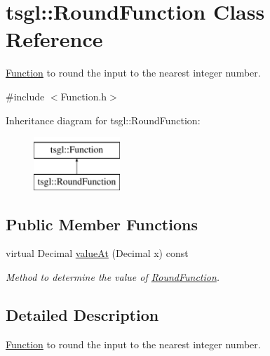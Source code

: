 \hypertarget{classtsgl_1_1_round_function}{\section{tsgl\-:\-:\-Round\-Function \-Class \-Reference}
\label{classtsgl_1_1_round_function}
}


\hyperlink{classtsgl_1_1_function}{\-Function} to round the input to the nearest integer number.  




{\ttfamily \#include $<$\-Function.\-h$>$}

\-Inheritance diagram for tsgl\-:\-:\-Round\-Function\-:\begin{figure}[H]
\begin{center}
\leavevmode
\includegraphics[height=2.000000cm]{classtsgl_1_1_round_function}
\end{center}
\end{figure}
\subsection*{\-Public \-Member \-Functions}
\begin{DoxyCompactItemize}
\item 
virtual \-Decimal \hyperlink{classtsgl_1_1_round_function_a3047ee723fae828d9379d946012028ca}{value\-At} (\-Decimal x) const 
\begin{DoxyCompactList}\small\item\em \-Method to determine the value of \hyperlink{classtsgl_1_1_round_function}{\-Round\-Function}. \end{DoxyCompactList}\end{DoxyCompactItemize}


\subsection{\-Detailed \-Description}
\hyperlink{classtsgl_1_1_function}{\-Function} to round the input to the nearest integer number. 

